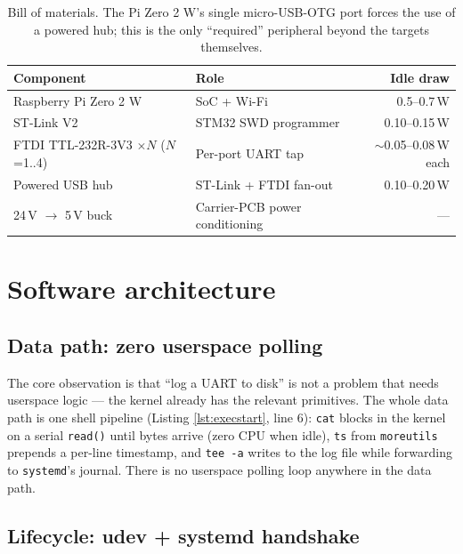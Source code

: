 \documentclass[11pt,a4paper]{article}
\begin{document}
\begin{table}[!h]
\centering\small
\renewcommand{\arraystretch}{1.15}
\begin{tabular}{@{} l l r @{}}
\toprule
\textbf{Component} & \textbf{Role} & \textbf{Idle draw} \\
\midrule
Raspberry Pi Zero 2 W              & SoC + Wi-Fi              & 0.5--0.7\,W \\
ST-Link V2                         & STM32 SWD programmer     & 0.10--0.15\,W \\
FTDI TTL-232R-3V3 $\times N$ ($N$=1..4) & Per-port UART tap   & $\sim$0.05--0.08\,W each \\
Powered USB hub                    & ST-Link + FTDI fan-out   & 0.10--0.20\,W \\
24\,V $\rightarrow$ 5\,V buck      & Carrier-PCB power conditioning & --- \\
\bottomrule
\end{tabular}
\caption{Bill of materials. The Pi Zero 2 W's single micro-USB-OTG
port forces the use of a powered hub; this is the only ``required''
peripheral beyond the targets themselves.}
\label{tab:bom}
\end{table}

\section{Software architecture}

\subsection{Data path: zero userspace polling}

The core observation is that ``log a UART to disk'' is not a problem
that needs userspace logic --- the kernel already has the relevant
primitives. The whole data path is one shell pipeline (Listing
\ref{lst:execstart}, line 6): \texttt{cat} blocks in the kernel on a
serial \texttt{read()} until bytes arrive (zero CPU when idle),
\texttt{ts} from \texttt{moreutils} prepends a per-line timestamp,
and \texttt{tee -a} writes to the log file while forwarding to
\texttt{systemd}'s journal. There is no userspace polling loop
anywhere in the data path.

\subsection{Lifecycle: udev + systemd handshake}
\end{document}
